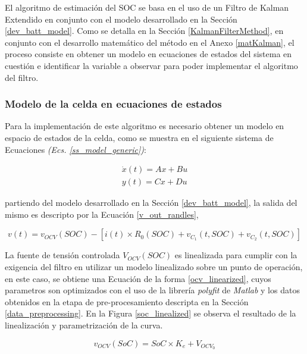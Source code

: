 \documentclass[10pt, a4paper]{report}
\begin{document}
El algoritmo de estimaci\'on del \acrshort{SOC} se basa en el uso 
de un Filtro de Kalman Extendido en conjunto con el modelo desarrollado en la 
Secci\'on \ref{dev_batt_model}. Como se detalla en la Secci\'on
\ref{KalmanFilterMethod}, en conjunto con el desarrollo matem\'atico del
m\'etodo en el Anexo \ref{matKalman}, el proceso consiste en obtener un modelo
en ecuaciones de estados del sistema en cuesti\'on e identificar la variable a 
observar para poder implementar el algoritmo del filtro.

\subsubsection{Modelo de la celda en ecuaciones de estados}

Para la implementaci\'on de este algoritmo es necesario obtener un modelo en
espacio de estados de la celda, como se muestra en el siguiente sistema de
Ecuaciones \emph{(Ecs. \ref{ss_model_generic})}:

\begin{align}
    \dot{x}(t) = Ax+Bu	\nonumber\\
    y(t)=Cx+Du
    \label{ss_model_generic}	
\end{align}

partiendo del modelo desarrollado en la Secci\'on \ref{dev_batt_model}, la
salida del mismo es descripto por la Ecuaci\'on \ref{v_out_randles},

\begin{equation}
    v(t) = v_{OCV}(SOC) - \left[i(t) \times R_0\left(SOC\right)  + v_{C_1}\left(t,
    SOC\right) + v_{C_2}\left(t, SOC\right)\right] \label{v_out_randles}
\end{equation}

\noindent La fuente de tensión controlada $V_{OCV}(SOC)$ es linealizada para 
cumplir con la exigencia del filtro en utilizar un modelo linealizado sobre un
punto de operaci\'on, en este caso, se obtiene una Ecuaci\'on de la forma
\ref{ocv_linearized}, cuyos parametros son optimizados con el uso de la
librer\'ia \emph{polyfit} de \emph{Matlab} y los datos obtenidos en la etapa de
pre-procesamiento descripta en la Secci\'on \ref{data_preprocessing}. En la 
Figura \ref{soc_linealized} se observa el resultado de la linealizaci\'on y
parametrizaci\'on de la curva.

\begin{equation}
    v_{OCV}(SoC) = SoC \times K_e + V_{OCV_0} 
    \label{ocv_linearized}
\end{equation}
\end{document}
